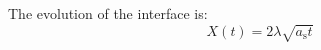 The evolution of the interface is:
\begin{equation}
	X(t)=2 \lambda \sqrt{a_{\mathrm{s}} t}
\end{equation}
%
%

